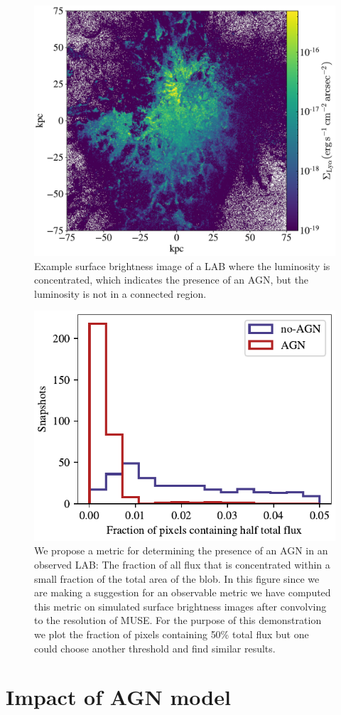 \begin{figure}
    \centering
    \includegraphics[width=\textwidth,height=\textheight,keepaspectratio]{figures/141.pdf}
    \caption{
        Example surface brightness image of a LAB where the luminosity is concentrated, which indicates the presence of an AGN, but the luminosity is not in a connected region.
    }
    \label{fig:agn_on_example}
\end{figure}

\begin{figure}
    \centering
    \includegraphics[width=\textwidth,height=\textheight,keepaspectratio]{figures/skew_distribution.pdf}
    \caption{
        We propose a metric for determining the presence of an AGN in an observed LAB: The fraction of all flux that is concentrated within a small fraction of the total area of the blob.
    In this figure since we are making a suggestion for an observable metric we have computed this metric on simulated surface brightness images after convolving to the resolution of MUSE.
    For the purpose of this demonstration we plot the fraction of pixels containing 50\% total flux but one could choose another threshold and find similar results.
    }
    \label{fig:skewness}
\end{figure}

\section{Impact of AGN model}
